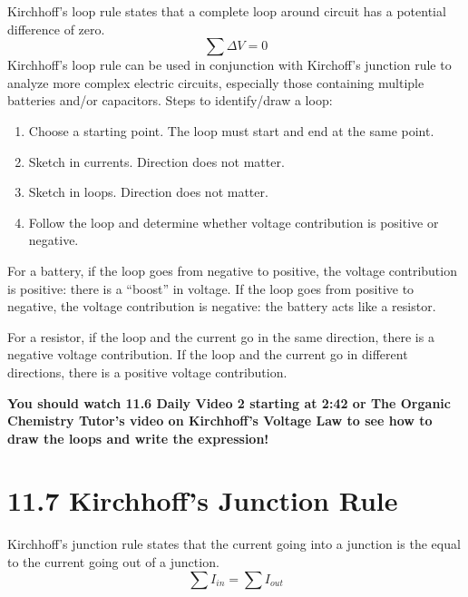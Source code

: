 \documentclass[12pt, titlepage]{article}
\begin{document}
Kirchhoff's loop rule states that a complete loop around circuit has a potential difference of zero.
\begin{equation*}
    \sum \Delta V = 0
\end{equation*}
Kirchhoff's loop rule can be used in conjunction with Kirchoff's junction rule to analyze more complex electric circuits, especially those containing multiple batteries and/or capacitors. Steps to identify/draw a loop: 
\begin{enumerate}
    \item Choose a starting point. The loop must start and end at the same point.
    \item Sketch in currents. Direction does not matter.
    \item Sketch in loops. Direction does not matter.
    \item Follow the loop and determine whether voltage contribution is positive or negative.
\end{enumerate}
For a battery, if the loop goes from negative to positive, the voltage contribution is positive: there is a ``boost'' in voltage. If the loop goes from positive to negative, the voltage contribution is negative: the battery acts like a resistor.

For a resistor, if the loop and the current go in the same direction, there is a negative voltage contribution. If the loop and the current go in different directions, there is a positive voltage contribution.

\textbf{You should watch 11.6 Daily Video 2 starting at 2:42 or The Organic Chemistry Tutor's video on Kirchhoff's Voltage Law to see how to draw the loops and write the expression!}

\section*{11.7 Kirchhoff's Junction Rule}
Kirchhoff's junction rule states that the current going into a junction is the equal to the current going out of a junction.
\begin{equation*}
    \sum I_{in} = \sum I_{out}
\end{equation*}
\end{document}
